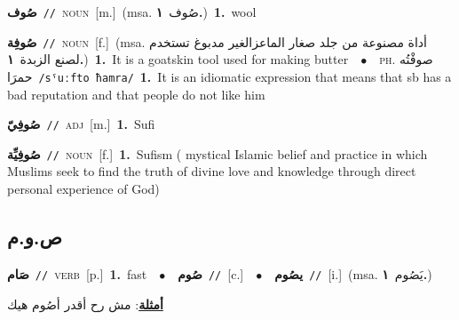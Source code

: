 \documentclass[10pt,a4paper,twoside]{article} %
\begin{document}
\begin{multicols}{2}
{\setlength\topsep{0pt}\textbf{\foreignlanguage{arabic}{صُوف}}\ {\color{gray}\texttt{//}\color{black}}\ \textsc{noun}\ [m.]\ \color{gray}(msa. \foreignlanguage{arabic}{صُوف}~\foreignlanguage{arabic}{\textbf{١.}})\color{black}\ \textbf{1.}~wool\ } \vspace{2mm}

{\setlength\topsep{0pt}\textbf{\foreignlanguage{arabic}{صُوفِة}}\ {\color{gray}\texttt{//}\color{black}}\ \textsc{noun}\ [f.]\ \color{gray}(msa. \foreignlanguage{arabic}{أداة مصنوعة من جلد صغار الماعزالغير مدبوغ تستخدم لصنع الزبدة}~\foreignlanguage{arabic}{\textbf{١.}})\color{black}\ \textbf{1.}~It is a goatskin tool used for making butter\ \ $\bullet$\ \ \textsc{ph.} \color{gray} \foreignlanguage{arabic}{صوفْتُه حمرَا}\color{black}\ {\color{gray}\texttt{/{\sffamily sˤuːfto ħamra}/}\color{black}}\ \textbf{1.}~It is an idiomatic expression that means that sb has a bad reputation and that people do not like him\ } \vspace{2mm}

{\setlength\topsep{0pt}\textbf{\foreignlanguage{arabic}{صُوفِيّ}}\ {\color{gray}\texttt{//}\color{black}}\ \textsc{adj}\ [m.]\ \textbf{1.}~Sufi\ } \vspace{2mm}

{\setlength\topsep{0pt}\textbf{\foreignlanguage{arabic}{صُوفِيِّة}}\ {\color{gray}\texttt{//}\color{black}}\ \textsc{noun}\ [f.]\ \textbf{1.}~Sufism ( mystical Islamic belief and practice in which Muslims seek to find the truth of divine love and knowledge through direct personal experience of God)\ } \vspace{2mm}

\vspace{-3mm}
\subsection*{\color{blue}\foreignlanguage{arabic}{ص.و.م}\color{blue}{}} 

{\setlength\topsep{0pt}\textbf{\foreignlanguage{arabic}{صَام}}\ {\color{gray}\texttt{//}\color{black}}\ \textsc{verb}\ [p.]\ \textbf{1.}~fast\ \ $\bullet$\ \ \setlength\topsep{0pt}\textbf{\foreignlanguage{arabic}{صُوم}}\ {\color{gray}\texttt{//}\color{black}}\ [c.]\ \ $\bullet$\ \ \setlength\topsep{0pt}\textbf{\foreignlanguage{arabic}{يصُوم}}\ {\color{gray}\texttt{//}\color{black}}\ [i.]\ \color{gray}(msa. \foreignlanguage{arabic}{يَصُوم}~\foreignlanguage{arabic}{\textbf{١.}})\color{black}\  \begin{flushright}\color{gray}\foreignlanguage{arabic}{\textbf{\underline{\foreignlanguage{arabic}{أمثلة}}}: مش رح أقدر أصُوم هيك}\end{flushright}\color{black}} \vspace{2mm}


\end{multicols}
\end{document}

